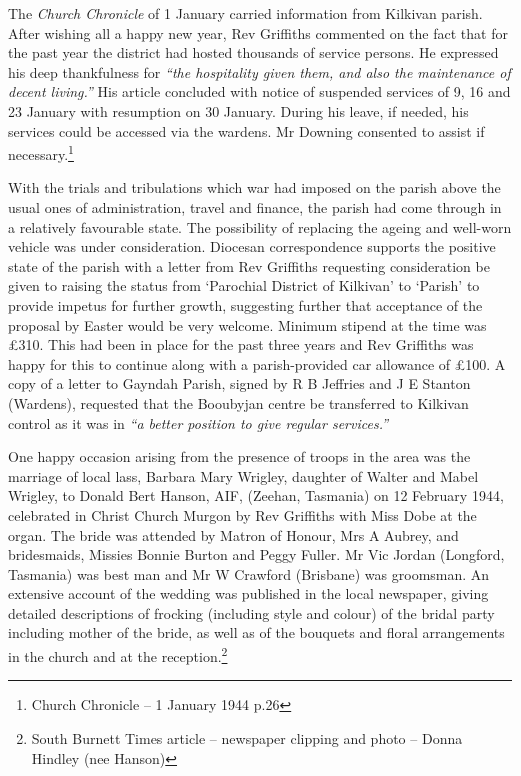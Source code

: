 The \emph{Church Chronicle} of 1 January carried information from Kilkivan parish. After wishing all a happy new year, Rev Griffiths commented on the fact that for the past year the district had hosted thousands of service persons. He expressed his deep thankfulness for \emph{``the hospitality given them, and also the maintenance of decent living.''} His article concluded with notice of suspended services of 9, 16 and 23 January with resumption on 30 January. During his leave, if needed, his services could be accessed via the wardens. Mr Downing consented to assist if necessary.\footnote{Church Chronicle -- 1 January 1944 p.26}


With the trials and tribulations which war had imposed on the parish above the usual ones of administration, travel and finance, the parish had come through in a relatively favourable state. The possibility of replacing the ageing and well-worn vehicle was under consideration. Diocesan correspondence supports the positive state of the parish with a letter from Rev Griffiths requesting consideration be given to raising the status from `Parochial District of Kilkivan' to `Parish' to provide impetus for further growth, suggesting further that acceptance of the proposal by Easter would be very welcome. Minimum stipend at the time was \pounds310. This had been in place for the past three years and Rev Griffiths was happy for this to continue along with a parish-provided car allowance of \pounds100. A copy of a letter to Gayndah Parish, signed by R B Jeffries and J E Stanton (Wardens), requested that the Booubyjan centre be transferred to Kilkivan control as it was in \emph{``a better position to give regular services.''}



One happy occasion arising from the presence of troops in the area was the marriage of local lass, Barbara Mary Wrigley, daughter of Walter and Mabel Wrigley, to Donald Bert Hanson, AIF, (Zeehan, Tasmania) on 12 February 1944, celebrated in Christ Church Murgon by Rev Griffiths with Miss Dobe at the organ. The bride was attended by Matron of Honour, Mrs A Aubrey, and bridesmaids, Missies Bonnie Burton and Peggy Fuller. Mr Vic Jordan (Longford, Tasmania) was best man and Mr W Crawford (Brisbane) was groomsman. An extensive account of the wedding was published in the local newspaper, giving detailed descriptions of frocking (including style and colour) of the bridal party including mother of the bride, as well as of the bouquets and floral arrangements in the church and at the reception.\footnote{South Burnett Times article -- newspaper clipping and photo -- Donna Hindley (nee Hanson)}








